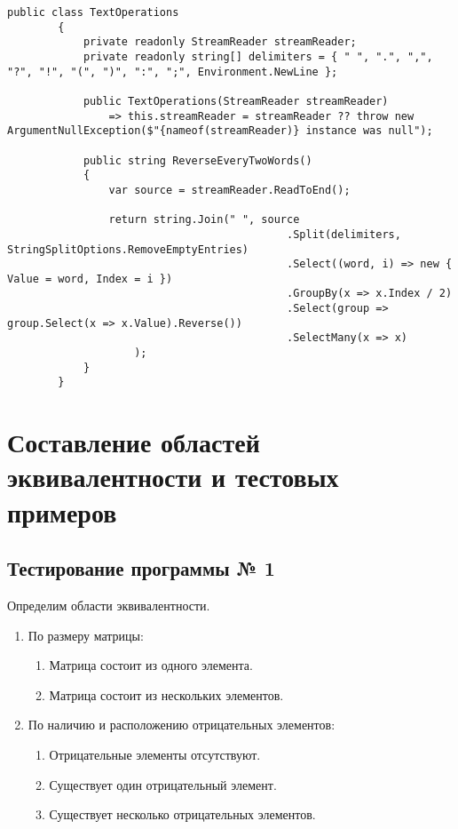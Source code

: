 \documentclass[a4paper,14pt]{extarticle}
\begin{document}
    \begin{lstlisting}[language={[Sharp]C}]
        public class TextOperations
        {
            private readonly StreamReader streamReader;
            private readonly string[] delimiters = { " ", ".", ",", "?", "!", "(", ")", ":", ";", Environment.NewLine };

            public TextOperations(StreamReader streamReader)
                => this.streamReader = streamReader ?? throw new ArgumentNullException($"{nameof(streamReader)} instance was null");

            public string ReverseEveryTwoWords()
            {
                var source = streamReader.ReadToEnd();

                return string.Join(" ", source
                                            .Split(delimiters, StringSplitOptions.RemoveEmptyEntries)
                                            .Select((word, i) => new { Value = word, Index = i })
                                            .GroupBy(x => x.Index / 2)
                                            .Select(group => group.Select(x => x.Value).Reverse())
                                            .SelectMany(x => x)
                    );
            }
        }
    \end{lstlisting}

    \section{Составление областей эквивалентности и тестовых примеров}
    \subsection{Тестирование программы № 1}

    Определим области эквивалентности.
    \begin{enumerate}
        \item По размеру матрицы:
        \begin{enumerate}
            \item Матрица состоит из одного элемента.
            \item Матрица состоит из нескольких элементов.
        \end{enumerate}
        \item По наличию и расположению отрицательных элементов:
        \begin{enumerate}
            \item Отрицательные элементы отсутствуют.
            \item Существует один отрицательный элемент.
            \item Существует несколько отрицательных элементов.
        \end{enumerate}
    \end{enumerate}
\end{document}

